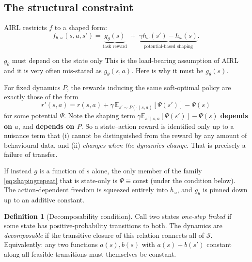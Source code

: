 \documentclass[11pt]{article}
\theoremstyle{plain}
\theoremstyle{definition}
\newtheorem{definition}[theorem]{Definition}
\theoremstyle{remark}
\renewcommand{\S}{\mathcal{S}}
\newcommand{\E}{\mathbb{E}}
\begin{document}
\subsection{The structural constraint}

AIRL restricts $f$ to a shaped form:
\begin{equation}
f_{\theta,\omega}(s,a,s') = \underbrace{g_\theta(s)}_{\text{task reward}}
\;+\; \underbrace{\gamma h_\omega(s') - h_\omega(s)}_{\text{potential-based
shaping}}.
\label{eq:airlshaped}
\end{equation}

\begin{redbox}{$g_\theta$ must depend on the state only}
This is the load-bearing assumption of AIRL and it is very often
mis-stated as $g_\theta(s,a)$. Here is why it must be $g_\theta(s)$.

For fixed dynamics $P$, the rewards inducing the same soft-optimal policy
are exactly those of the form
\begin{equation}
r'(s,a) = r(s,a) + \gamma\,\E_{s'\sim P(\cdot\mid s,a)}[\Psi(s')] - \Psi(s)
\label{eq:shapingrepeat}
\end{equation}
for some potential $\Psi$. Note the shaping term $\gamma\E_{s'\mid
s,a}[\Psi(s')]-\Psi(s)$ \textbf{depends on $a$}, and \textbf{depends on
$P$}. So a state--action reward is identified only up to a nuisance term
that (i) cannot be distinguished from the reward by any amount of
behavioural data, and (ii) \emph{changes when the dynamics change}. That
is precisely a failure of transfer.

If instead $g$ is a function of $s$ alone, the only member of the family
\eqref{eq:shapingrepeat} that is state-only is $\Psi\equiv\text{const}$
(under the condition below). The action-dependent freedom is squeezed
entirely into $h_\omega$, and $g_\theta$ is pinned down up to an additive
constant.
\end{redbox}

\begin{definition}[Decomposability condition]
Call two states \emph{one-step linked} if some state has positive-probability
transitions to both. The dynamics are \emph{decomposable} if the
transitive closure of this relation connects all of $\S$. Equivalently:
any two functions $a(s),b(s)$ with $a(s)+b(s')$ constant along all
feasible transitions must themselves be constant.
\end{definition}
\end{document}
